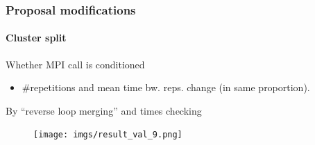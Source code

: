 \documentclass{beamer}
\begin{document}

\begin{frame}
\frametitle{Proposal modifications}
\framesubtitle{Cluster split}
Whether MPI call is conditioned
\begin{itemize}
	\item \#repetitions and mean time bw. reps. change (in same proportion).
\end{itemize} 
\pause
By ``reverse loop merging'' and times checking
\begin{figure}
	\texttt{[image: imgs/result\_val\_9.png]}
\end{figure}
\end{frame}
\end{document}
